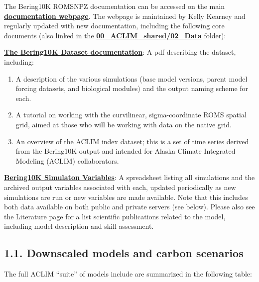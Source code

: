 \documentclass[
]{article}
\begin{document}
The Bering10K ROMSNPZ documentation can be accessed on the main
\href{https://beringnpz.github.io/roms-bering-sea/B10K-dataset-docs/}{\textbf{documentation
webpage}}. The webpage is maintained by Kelly Kearney and regularly
updated with new documentation, including the following core documents
(also linked in the
\href{https://drive.google.com/drive/u/0/folders/0Bx7wdZllbuF9eDJndkhCS2EwQUk}{\textbf{00\_ACLIM\_shared/02\_Data}}
folder):

\href{https://drive.google.com/file/d/1GlITTIvbs2gRBMNIxdDI15cZU6mH4ckg/view}{\textbf{The
Bering10K Dataset documentation}}: A pdf describing the dataset,
including:

\begin{enumerate}
\def\labelenumi{\arabic{enumi}.}
\item
  A description of the various simulations (base model versions, parent
  model forcing datasets, and biological modules) and the output naming
  scheme for each.
\item
  A tutorial on working with the curvilinear, sigma-coordinate ROMS
  spatial grid, aimed at those who will be working with data on the
  native grid.
\item
  An overview of the ACLIM index dataset; this is a set of time series
  derived from the Bering10K output and intended for Alaska Climate
  Integrated Modeling (ACLIM) collaborators.
\end{enumerate}

\href{https://drive.google.com/file/d/1C1FCxRMBm0uBv2wEKwrGfHmLnjt_gFvG/view}{\textbf{Bering10K
Simulaton Variables}}: A spreadsheet listing all simulations and the
archived output variables associated with each, updated periodically as
new simulations are run or new variables are made available. Note that
this includes both data available on both public and private servers
(see below). Please also see the Literature page for a list scientific
publications related to the model, including model description and skill
assessment.

\hypertarget{downscaled-models-and-carbon-scenarios}{%
\subsection{1.1. Downscaled models and carbon
scenarios}\label{downscaled-models-and-carbon-scenarios}}

The full ACLIM ``suite'' of models include are summarized in the
following table:
\end{document}
